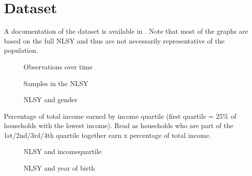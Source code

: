 \FloatBarrier\section{Dataset}
A documentation of the dataset is available in \cite{NLSY.2014}. Note that most of the graphs are based on the full NLSY and thus are not necessarily representative of the population.

\begin{figure}[htp]\centering
\caption{Observations over time}
\end{figure}

\begin{figure}[htp]\centering
\caption{Samples in the NLSY}
\end{figure}

\begin{figure}[htp]\centering
\caption{NLSY and gender}
\end{figure}

Percentage of total income earned by income quartile (first quartile = 25\% of households with the lowest income). Read as households who are part of the 1st/2nd/3rd/4th quartile together earn x percentage of total income.

\begin{figure}[htp]\centering
\caption{NLSY and incomequartile}
\end{figure}

\begin{figure}[htp]\centering
\caption{NLSY and year of birth}
\end{figure}
